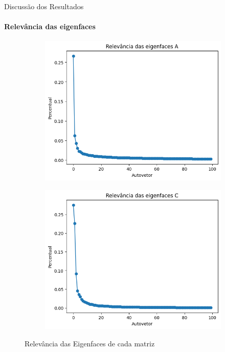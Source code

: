 \documentclass[xcolor=dvipsnames,t,aspectratio=169]{beamer} %
\begin{document}
\begin{frame}[c]{Discussão dos Resultados}
\framesubtitle{Relevância das eigenfaces}

    \hfill
    \begin{figure}[H]
              \begin{subfigure}{0.4\textwidth}
                \centering
                \includegraphics[width=\textwidth]{img/MAIN_10.png}
                \label{fig:imagem1}
              \end{subfigure}
              \hfill
              \begin{subfigure}{0.4\textwidth}
                \centering
                \includegraphics[width=\textwidth]{img/MAIN_11.png}
                \label{fig:imagem2}
              \end{subfigure}
              \caption{Relevância das Eigenfaces de cada matriz}
        \end{figure}
    \hfill

\end{frame}
\end{document}
